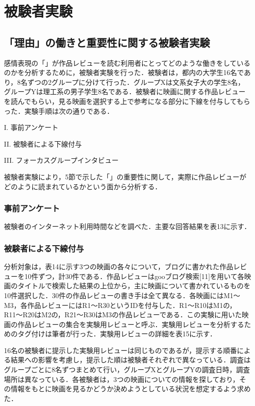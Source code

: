 \documentclass[japanese]{jnlp_1.3a}
\begin{document}
\section{被験者実験}

\subsection{「理由」の働きと重要性に関する被験者実験}

感情表現の「」が作品レビューを読む利用者にとってどのような働きをしているのかを分析するために，被験者実験を行った．被験者は，都内の大学生16名であり，8名ずつの2グループに分けて行った．グループXは文系女子大の学生8名，グループYは理工系の男子学生8名である．被験者に映画に関する作品レビューを読んでもらい，見る映画を選択する上で参考になる部分に下線を付与してもらった．実験手順は次の通りである．

I. 事前アンケート

II. 被験者による下線付与

III. フォーカスグループインタビュー

被験者実験により，5節で示した「」の重要性に関して，実際に作品レビューがどのように読まれているかという面から分析する．

\subsubsection{事前アンケート}

被験者のインターネット利用時間などを調べた．主要な回答結果を表13に示す．

\subsubsection{被験者による下線付与}

分析対象は，表14に示す3つの映画の各々について，ブログに書かれた作品レビューを10件ずつ，計30件である．作品レビューはgooブログ検索[11]を用いて各映画のタイトルで検索した結果の上位から，主に映画について書かれているものを10件選択した．30件の作品レビューの書き手は全て異なる．各映画にはM1〜M3，各作品レビューにはR1〜R30というIDを付与した．R1〜R10はM1の，R11〜R20はM2の，R21〜R30はM3の作品レビューである．この実験に用いた映画の作品レビューの集合を実験用レビューと呼ぶ．実験用レビューを分析するためのタグ付けは筆者が行った．実験用レビューの詳細を表15に示す．

16名の被験者に提示した実験用レビューは同じものであるが，提示する順番による結果への影響を考慮し，提示した順は被験者それぞれで異なっている．調査はグループごとに8名ずつまとめて行い，グループXとグループYの調査日時，調査場所は異なっている．各被験者は，3つの映画についての情報を探しており，その情報をもとに映画を見るかどうか決めようとしている状況を想定するよう求めた．
\end{document}

